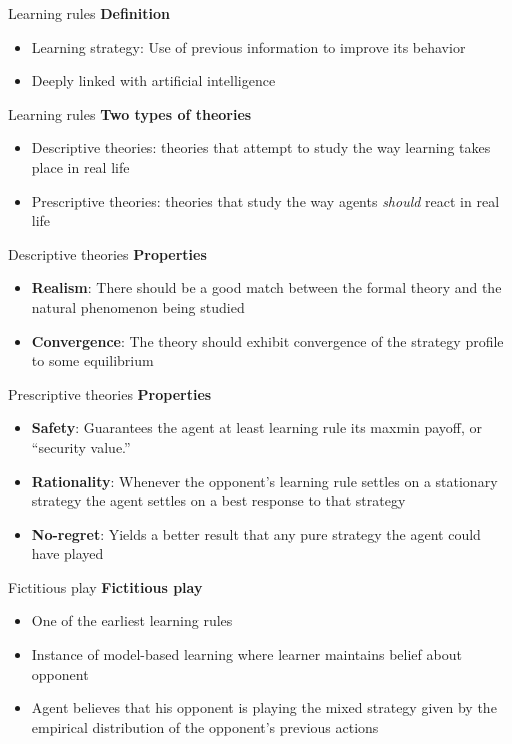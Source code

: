
\begin{frame}{Learning rules}
    \textbf{Definition}
    \begin{itemize}
        \item Learning strategy: Use of previous information to improve its behavior
        \item Deeply linked with artificial intelligence
    \end{itemize}
\end{frame}

\begin{frame}{Learning rules}
    \textbf{Two types of theories}
    \begin{itemize}
        \item Descriptive theories: theories that attempt to study the way learning takes place in real life
        \item Prescriptive theories: theories that study the way agents \textit{should} react in real life
    \end{itemize}
\end{frame}

\begin{frame}{Descriptive theories}
    \textbf{Properties}
    \begin{itemize}
        \item \textbf{Realism}: There should be a good match between the formal theory and the natural phenomenon being studied
        \item \textbf{Convergence}: The theory should exhibit convergence of the strategy profile to some equilibrium
    \end{itemize}
\end{frame}

\begin{frame}{Prescriptive theories}
    \textbf{Properties}
    \begin{itemize}
        \item \textbf{Safety}: Guarantees the agent at least learning rule its maxmin payoff, or “security value.”
        \item \textbf{Rationality}: Whenever the opponent's learning rule settles on a stationary strategy the agent settles on a best response to that strategy
        \item \textbf{No-regret}: Yields a better result that any pure strategy the agent could have played
    \end{itemize}
\end{frame}

\begin{frame}{Fictitious play}
    \textbf{Fictitious play}
    \begin{itemize}
        \item One of the earliest learning rules 
        \item Instance of model-based learning where learner maintains belief about opponent
        \item Agent believes that his opponent is playing the mixed strategy given by the empirical distribution of the opponent’s previous actions
    \end{itemize}
\end{frame}

